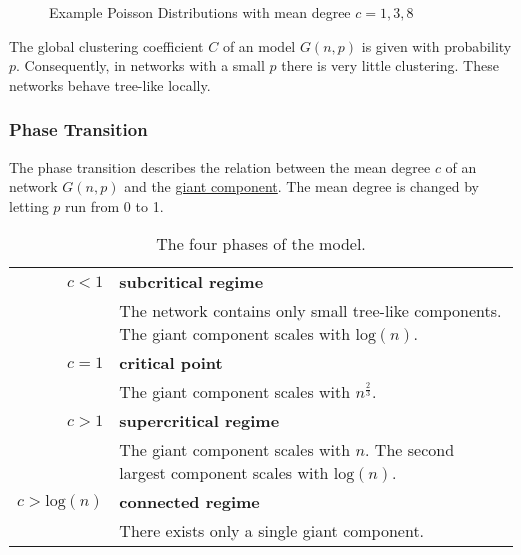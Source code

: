 \documentclass[english]{panikzettel}
\begin{document}
\begin{figure}[ht!]
	\centering
	\caption{Example Poisson Distributions with mean degree $ c = 1,3,8 $}
	\label{fig:example_poisson}
\end{figure}

The global clustering coefficient $ C $ of an \erdosrenyi model $ G(n,p) $ is given with probability $ p $. 
Consequently, in networks with a small $ p $ there is very little clustering.
These networks behave tree-like locally.

\subsubsection{Phase Transition}
The phase transition describes the relation between the mean degree $ c $ of an \erdosrenyi network $ G(n,p) $ and the \hyperref[sec:components]{giant component}. The mean degree is changed by letting $ p $ run from 0 to 1.

\begin{table}[ht!]
	\centering
	\begin{tabular}{|r|p{12cm}|}
		\hline
		$ c < 1 $ & \textbf{subcritical regime} \\
		& The network contains only small tree-like components. The giant component scales with $ \text{log}(n) $. \\
		\hline
		$ c = 1 $ & \textbf{critical point} \\
		& The giant component scales with $ n^\frac{2}{3} $. \\
		\hline
		$ c > 1 $ & \textbf{supercritical regime} \\
		& The giant component scales with $ n $. The second largest component scales with $ \text{log}(n) $. \\
		\hline
		$ c > \text{log}(n) $ & \textbf{connected regime} \\
		& There exists only a single giant component. \\
		\hline
	\end{tabular}
	\caption{The four phases of the \erdosrenyi model.}
	\label{tab:phase_transition}
\end{table}
\end{document}
